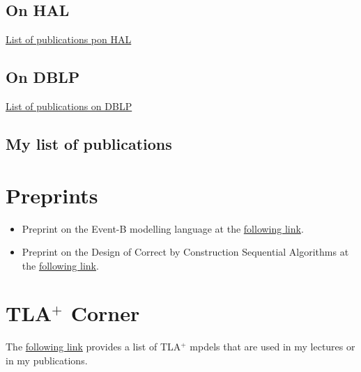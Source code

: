 \documentclass[ 12pt]{article}
\begin{document}
\subsection{On HAL}


 \href{https://haltools.inria.fr/Public/afficheRequetePubli.php?auteur_exp=dominique%2Cmery&annee_publideb=1980&annee_publifin=2024&CB_auteur=oui&CB_titre=oui&CB_article=oui&langue=Anglais&tri_exp=annee_publi&tri_exp2=typdoc&tri_exp3=date_publi&ordre_aff=TA&Fen=Aff&css=../css/VisuRubriqueEncadre.css}{List
   of publications pon HAL}

\subsection{On DBLP }
  \href{https://dblp.org/pid/51/6932.html}{List
   of publications on  DBLP }

 

 \subsection{My list of publications}
%
%




\section{Preprints}
\label{sec:documents}

\begin{itemize}

\item Preprint on the Event-B modelling language  at the 
  \href{http://mery54.github.io/mery/publications/preprint-chaptereventb.pdf}{following     link}. 

  \item Preprint on the Design of Correct by Construction Sequential
   Algorithms  at the 
  \href{http://mery54.github.io/mery/publications/preprint-chapterseqalgo.pdf}{following     link}. 

\end{itemize}

\section{TLA$^+$ Corner}
\label{sec:tla+-corner}

 The  \href{http://mery54.github.io/mery/tla/}{following
   link} provides a list of TLA$^+$ mpdels that are  used in my
 lectures or in my publications. 
\end{document}
